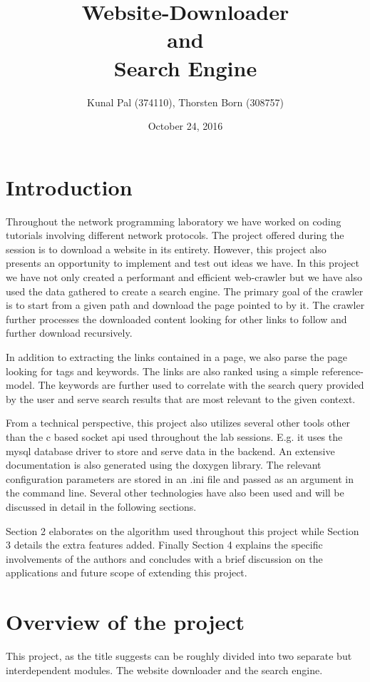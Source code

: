 \documentclass{project_report}
\title{Website-Downloader \\and \\Search Engine}
\author{Kunal Pal (374110), Thorsten Born (308757)}
\date{October 24, 2016}
\begin{document}
\maketitle

\section{Introduction} 

Throughout the network programming laboratory we have worked on coding tutorials involving different network protocols. The project offered during the session is to download a website in its entirety. However, this project also presents an opportunity to implement and test out ideas we have. In this project we have not only created a performant and efficient web-crawler but we have also used the data gathered to create a search engine. The primary goal of the crawler is to start from a given path and download the page pointed to by it. The crawler further processes the downloaded content looking for other links to follow and further download recursively.

In addition to extracting the links contained in a page, we also parse the page looking for tags and keywords. The links are also ranked using a simple reference-model. The keywords are further used to correlate with the search query provided by the user and serve search results that are most relevant to the given context.

From a technical perspective, this project also utilizes several other tools other than the c based socket api used throughout the lab sessions. E.g. it uses the mysql database driver to store and serve data in the backend. An extensive documentation is also generated using the doxygen library. The relevant configuration parameters are stored in an .ini file and passed as an argument in the command line. Several other technologies have also been used and will be discussed in detail in the following sections.

Section 2 elaborates on the algorithm used throughout this project while Section 3 details the extra features added. Finally Section 4 explains the specific involvements of the authors and concludes with a brief discussion on the applications and future scope of extending this project.

\section{Overview of the project}
This project, as the title suggests can be roughly divided into two separate but interdependent modules. The website downloader and the search engine. 
\end{document}
